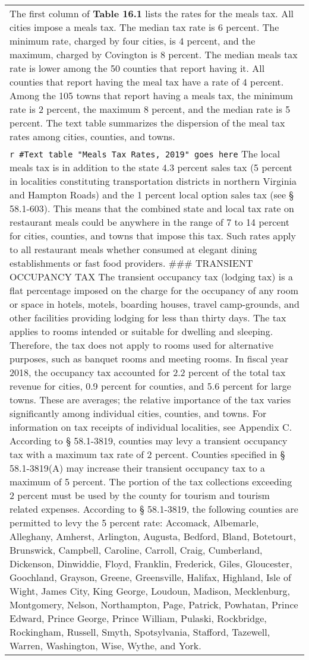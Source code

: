 \documentclass[
]{book}
\begin{document}
\begin{longtable}[]{@{}
  >{\raggedright\arraybackslash}p{}@{}}
\textbar{}
\textbar{} The first column of \textbf{Table 16.1} lists the rates for the meals tax. All cities impose a meals tax. The median tax rate is 6 percent. The minimum rate, charged by four cities, is 4 percent, and the maximum, charged by Covington is 8 percent. The median meals tax rate is lower among the 50 counties that report having it. All counties that report having the meal tax have a rate of 4 percent. Among the 105 towns that report having a meals tax, the minimum rate is 2 percent, the maximum 8 percent, and the median rate is 5 percent.
\textbar{}
\textbar{} The text table summarizes the dispersion of the meal tax rates among cities, counties, and towns. \\
\texttt{r\ \#Text\ table\ "Meals\ Tax\ Rates,\ 2019"\ goes\ here}
\textbar{}
\textbar{} The local meals tax is in addition to the state 4.3 percent sales tax (5 percent in localities constituting transportation districts in northern Virginia and Hampton Roads) and the 1 percent local option sales tax (see § 58.1-603). This means that the combined state and local tax rate on restaurant meals could be anywhere in the range of 7 to 14 percent for cities, counties, and towns that impose this tax. Such rates apply to all restaurant meals whether consumed at elegant dining establishments or fast food providers.
\textbar{}
\#\#\# TRANSIENT OCCUPANCY TAX
\textbar{} The transient occupancy tax (lodging tax) is a flat percentage imposed on the charge for the occupancy of any room or space in hotels, motels, boarding houses, travel camp-grounds, and other facilities providing lodging for less than thirty days. The tax applies to rooms intended or suitable for dwelling and sleeping. Therefore, the tax does not apply to rooms used for alternative purposes, such as banquet rooms and meeting rooms.
\textbar{}
\textbar{} In fiscal year 2018, the occupancy tax accounted for 2.2 percent of the total tax revenue for cities, 0.9 percent for counties, and 5.6 percent for large towns. These are averages; the relative importance of the tax varies significantly among individual cities, counties, and towns. For information on tax receipts of individual localities, see Appendix C.
\textbar{}
\textbar{} According to § 58.1-3819, counties may levy a transient occupancy tax with a maximum tax rate of 2 percent. Counties specified in § 58.1-3819(A) may increase their transient occupancy tax to a maximum of 5 percent. The portion of the tax collections exceeding 2 percent must be used by the county for tourism and tourism related expenses. According to § 58.1-3819, the following counties are permitted to levy the 5 percent rate: Accomack, Albemarle, Alleghany, Amherst, Arlington, Augusta, Bedford, Bland, Botetourt, Brunswick, Campbell, Caroline, Carroll, Craig, Cumberland, Dickenson, Dinwiddie, Floyd, Franklin, Frederick, Giles, Gloucester, Goochland, Grayson, Greene, Greensville, Halifax, Highland, Isle of Wight, James City, King George, Loudoun, Madison, Mecklenburg, Montgomery, Nelson, Northampton, Page, Patrick, Powhatan, Prince Edward, Prince George, Prince William, Pulaski, Rockbridge, Rockingham, Russell, Smyth, Spotsylvania, Stafford, Tazewell, Warren, Washington, Wise, Wythe, and York.

\end{longtable}
\end{document}
